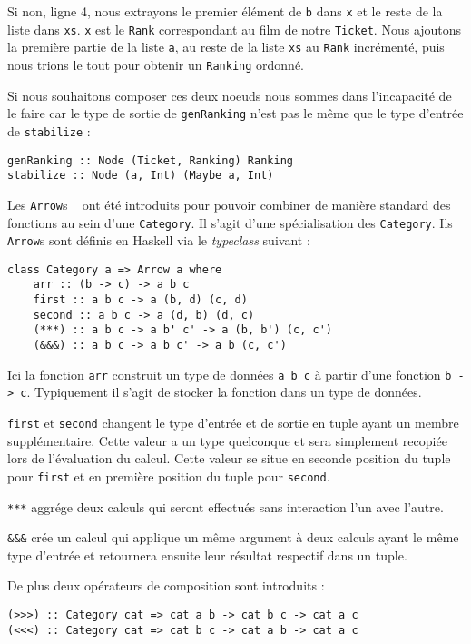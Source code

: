 \documentclass{llncs}
\newcommand{\Arrs}{\lstinline{Arrow}s }
\begin{document}
Si non, ligne 4, nous extrayons le premier élément de \lstinline{b} dans \lstinline{x}
et le reste de la liste dans \lstinline{xs}.
\lstinline{x} est le \lstinline{Rank} correspondant au film de notre \lstinline{Ticket}.
Nous ajoutons la première partie de la liste \lstinline{a}, au reste de la liste
\lstinline{xs} au \lstinline{Rank} incrémenté, puis nous trions le tout pour obtenir
un \lstinline{Ranking} ordonné.

Si nous souhaitons composer ces deux noeuds nous sommes dans l'incapacité de le
faire car le type de sortie de \lstinline{genRanking} n'est pas le même que le
type d'entrée de \lstinline{stabilize} :
\begin{lstlisting}
genRanking :: Node (Ticket, Ranking) Ranking
stabilize :: Node (a, Int) (Maybe a, Int)
\end{lstlisting}

Les \Arrs~\cite{Hughes00} ont été introduits pour pouvoir combiner de manière
standard des fonctions au sein d'une \lstinline{Category}.
Il s'agit d'une spécialisation des \lstinline{Category}.
Ils \Arrs sont définis en Haskell via le \emph{typeclass} suivant :
\begin{lstlisting}
class Category a => Arrow a where
    arr :: (b -> c) -> a b c
    first :: a b c -> a (b, d) (c, d)
    second :: a b c -> a (d, b) (d, c)
    (***) :: a b c -> a b' c' -> a (b, b') (c, c')
    (&&&) :: a b c -> a b c' -> a b (c, c')
\end{lstlisting}

Ici la fonction \lstinline{arr} construit un type de données
\lstinline{a b c} à partir d'une fonction \lstinline{b -> c}.
Typiquement il s'agit de stocker la fonction dans un type de données.

\lstinline{first} et \lstinline{second} changent le type d'entrée et de sortie
en tuple ayant un membre supplémentaire.
Cette valeur a un type quelconque et sera simplement recopiée lors de l'évaluation
du calcul.
Cette valeur se situe en seconde position du tuple pour \lstinline{first} et en
première position du tuple pour \lstinline{second}.

\lstinline{***} aggrége deux calculs qui seront effectués sans interaction l'un
avec l'autre.

\lstinline{&&&} crée un calcul qui applique un même argument à deux calculs ayant
le même type d'entrée et retournera ensuite leur résultat respectif dans un tuple.

De plus deux opérateurs de composition sont introduits :
\begin{lstlisting}
(>>>) :: Category cat => cat a b -> cat b c -> cat a c
(<<<) :: Category cat => cat b c -> cat a b -> cat a c
\end{lstlisting}
\end{document}
